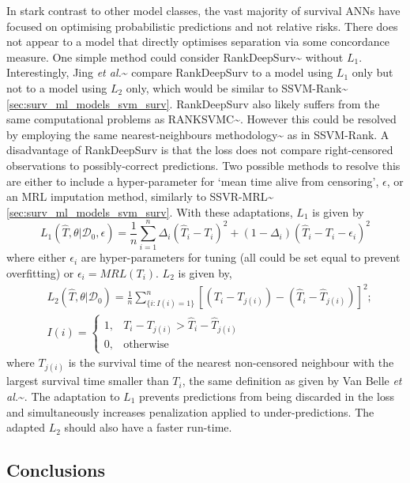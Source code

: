 \documentclass[
  letterpaper,
]{scrbook}
\theoremstyle{plain}
\theoremstyle{definition}
\theoremstyle{remark}
\begin{document}
In stark contrast to other model classes, the vast majority of survival
ANNs have focused on optimising probabilistic predictions and not
relative risks. There does not appear to a model that directly optimises
separation via some concordance measure. One simple method could
consider RankDeepSurv\textasciitilde{}\cite{Jing2019} without \(L_1\).
Interestingly, Jing \textit{et al.}\textasciitilde{}\cite{Jing2019}
compare RankDeepSurv to a model using \(L_1\) only but not to a model
using \(L_2\) only, which would be similar to
SSVM-Rank\textasciitilde{}\cite{VanBelle2011b}
\ref{sec:surv_ml_models_svm_surv}. RankDeepSurv also likely suffers from
the same computational problems as
RANKSVMC\textasciitilde{}\cite{VanBelle2007}. However this could be
resolved by employing the same nearest-neighbours
methodology\textasciitilde{}\cite{VanBelle2008} as in SSVM-Rank. A
disadvantage of RankDeepSurv is that the loss does not compare
right-censored observations to possibly-correct predictions. Two
possible methods to resolve this are either to include a hyper-parameter
for `mean time alive from censoring', \(\epsilon\), or an MRL imputation
method, similarly to SSVR-MRL\textasciitilde{}\cite{Goli2016a}
\ref{sec:surv_ml_models_svm_surv}. With these adaptations, \(L_1\) is
given by \[
L_1(\hat{T}, \theta|\mathcal{D}_0, \epsilon) = \frac{1}{n} \sum^n_{i=1} \Delta_i(\hat{T}_i - T_i)^2 + (1-\Delta_i)(\hat{T}_i - T_i - \epsilon_i)^2
\] where either \(\epsilon_i\) are hyper-parameters for tuning (all
could be set equal to prevent overfitting) or \(\epsilon_i = MRL(T_i)\).
\(L_2\) is given by, \[
\begin{split}
&L_2(\hat{T}, \theta|\mathcal{D}_0) = \frac{1}{n}\sum^n_{\{i : I(i) = 1\}} [(T_i - T_{j(i)}) - (\hat{T}_i - \hat{T}_{j(i)})]^2; \\
&I(i) =
\begin{cases}
1, & T_i - T_{j(i)} > \hat{T}_i - \hat{T}_{j(i)} \\
0, & \text{otherwise}
\end{cases}
\end{split}
\] where \(T_{j(i)}\) is the survival time of the nearest non-censored
neighbour with the largest survival time smaller than \(T_i\), the same
definition as given by Van Belle
\textit{et al.}\textasciitilde{}\cite{VanBelle2011b}. The adaptation to
\(L_1\) prevents predictions from being discarded in the loss and
simultaneously increases penalization applied to under-predictions. The
adapted \(L_2\) should also have a faster run-time.

\subsection{Conclusions}
\end{document}
